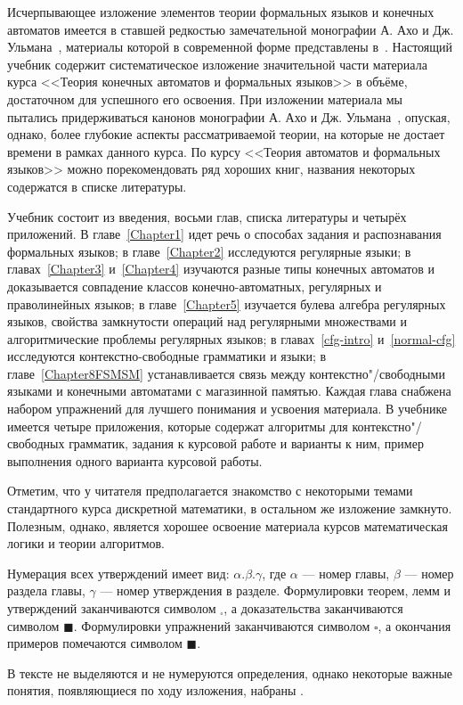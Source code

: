 Исчерпывающее изложение элементов теории формальных языков и конечных автоматов имеется в ставшей редкостью замечательной монографии А. Ахо и Дж. Ульмана~\cite{AU}, материалы которой в современной форме представлены в~\cite{Hop}. Настоящий учебник содержит систематическое изложение значительной части материала курса <<Теория конечных автоматов и формальных языков>> в объёме, достаточном для успешного его освоения. При изложении материала мы пытались придерживаться канонов монографии А. Ахо и Дж. Ульмана~\cite{AU}, опуская, однако, более глубокие аспекты рассматриваемой теории, на которые не достает времени в рамках данного курса. По курсу <<Теория автоматов и формальных языков>> можно порекомендовать ряд хороших книг, названия некоторых содержатся в списке литературы. 

Учебник состоит из введения, восьми глав, списка литературы и четырёх приложений. В главе~\ref{Chapter1} идет речь о способах задания и распознавания формальных языков; в главе~\ref{Chapter2} исследуются регулярные языки; в главах~\ref{Chapter3} и~\ref{Chapter4} изучаются разные типы конечных автоматов и доказывается совпадение классов конечно-автоматных, регулярных и праволинейных языков; в главе~\ref{Chapter5} изучается булева алгебра регулярных языков, свойства замкнутости операций над регулярными множествами и алгоритмические проблемы регулярных языков; в главах~\ref{cfg-intro} и~\ref{normal-cfg} исследуются контекстно-свободные грамматики и языки; в главе~\ref{Chapter8FSMSM} устанавливается связь между контекстно"/свободными языками и конечными автоматами с магазинной памятью. Каждая глава снабжена набором упражнений для лучшего понимания и усвоения материала. В учебнике имеется четыре приложения, которые содержат алгоритмы для контекстно"/свободных грамматик, задания к курсовой работе и варианты к ним, пример выполнения одного варианта курсовой работы.

Отметим, что у читателя предполагается знакомство с некоторыми темами стандартного курса дискретной математики, в остальном же изложение замкнуто. Полезным, однако, является хорошее освоение материала курсов математическая логики и теории алгоритмов.

Нумерация всех утверждений имеет вид: $\alpha.\beta.\gamma$, где $\alpha$ --- номер главы, $\beta$ --- номер раздела главы, $\gamma$ --- номер утверждения в разделе. Формулировки теорем, лемм и утверждений заканчиваются символом $_\square$, а доказательства заканчиваются символом $\blacksquare$. Формулировки упражнений заканчиваются символом $\square$, а окончания примеров помечаются символом $\blacksquare$.

В тексте не выделяются и не нумеруются определения, однако некоторые важные понятия, появляющиеся по ходу изложения, набраны .
